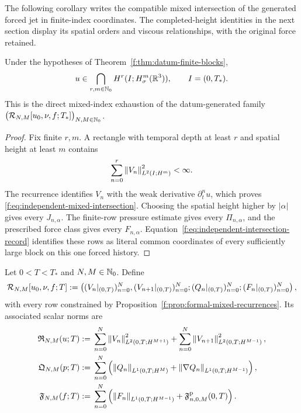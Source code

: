 The following corollary writes the compatible mixed intersection of the
generated forced jet in finite-index coordinates. The completed-height
identities in the next section display its spatial orders and viscous
relationships, with the original force retained.

\begin{corollary}
\label{f:thm:datum-intersection}
Under the hypotheses of Theorem~\ref{f:thm:datum-finite-blocks},
\begin{equation}
 u\in\bigcap_{r,m\in\mathbb N_0}H^r(I;H^m_\sigma(\mathbb R^3)),
 \qquad I=(0,T_*).
 \label{f:eq:independent-mixed-intersection}
\end{equation}
This is the direct mixed-index exhaustion of the datum-generated family
\(\bigl(\mathcal R_{N,M}[u_0,\nu,f;T_*]\bigr)_{N,M\in\mathbb N_0}\).
\end{corollary}

\begin{proof}

Fix finite \(r,m\).  A rectangle with temporal depth at least \(r\) and spatial
height at least \(m\) contains
\[
 \sum_{n=0}^{r}\left\lVert V_n\right\rVert_{L^2(I;H^m)}^2<\infty.
\]
The recurrence identifies \(V_n\) with the weak derivative
\(\partial_t^nu\), which proves
\eqref{f:eq:independent-mixed-intersection}.  Choosing the spatial height higher
by \(|\alpha|\) gives every \(J_{n,\alpha}\).  The finite-row pressure estimate
gives every \(\Pi_{n,\alpha}\), and the prescribed force class gives every
\(F_{n,\alpha}\).  Equation~\eqref{f:eq:independent-intersection-record}
identifies these rows as literal common coordinates of every sufficiently
large block on this one forced history.
\end{proof}

\begin{definition}
\label{f:def:finite-rectangle}
Let \(0<T<T_*\) and \(N,M\in\mathbb N_0\).  Define
\[
 \mathcal R_{N,M}[u_0,\nu,f;T]
 :=\left(
 (V_n|_{(0,T)})_{n=0}^{N},
 (V_{n+1}|_{(0,T)})_{n=0}^{N};
 (Q_n|_{(0,T)})_{n=0}^{N};
 (F_n|_{(0,T)})_{n=0}^{N}
 \right),
\]
with every row constrained by
Proposition~\ref{f:prop:formal-mixed-recurrences}.  Its associated scalar norms are
\begin{align}
 \mathfrak R_{N,M}(u;T)
 :={}&\sum_{n=0}^{N}
 \left\lVert V_n\right\rVert_{L^2(0,T;H^{M+1})}^2
 +\sum_{n=0}^{N}
 \left\lVert V_{n+1}\right\rVert_{L^2(0,T;H^{M-1})}^2,
 \label{f:eq:finite-rectangle-norm}\\
 \mathfrak Q_{N,M}(p;T)
 :={}&\sum_{n=0}^{N}
 \left(
 \left\lVert Q_n\right\rVert_{L^1(0,T;H^M)}
 +\left\lVert \nabla Q_n\right\rVert_{L^1(0,T;H^{M-1})}
 \right),
 \label{f:eq:finite-pressure-rectangle-norm}\\
 \mathfrak F_{N,M}(f;T)
 :={}&\sum_{n=0}^{N}\left(
 \left\lVert F_n\right\rVert_{L^1(0,T;H^{M-1})}
 +\mathfrak F^{\rm p}_{n,0,M}(0,T)
 \right).
 \label{f:eq:finite-force-rectangle-norm}
\end{align}
\end{definition}

